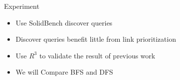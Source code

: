 \begin{frame}{Experiment}
    \begin{itemize}
        \item Use SolidBench \cite{taelman2023link} discover queries
        \item Discover queries benefit little from link prioritization \cite{eschauzier2023does}
        \item Use $ R^{3} $ to validate the result of previous work
        \item We will Compare BFS and DFS 
    \end{itemize}
\end{frame}